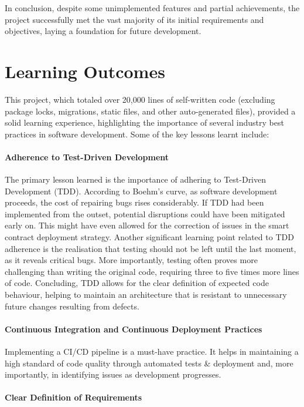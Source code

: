 In conclusion, despite some unimplemented features and partial achievements, the project successfully met the vast majority of its initial requirements and objectives, laying a foundation for future development.

\section{Learning Outcomes}

This project, which totaled over 20,000 lines of self-written code (excluding package locks, migrations, static files, and other auto-generated files), provided a solid learning experience, highlighting the importance of several industry best practices in software development. Some of the key lessons learnt include:

\paragraph{Adherence to Test-Driven Development}

The primary lesson learned is the importance of adhering to Test-Driven Development (TDD). According to Boehm's curve, as software development proceeds, the cost of repairing bugs rises considerably. If TDD had been implemented from the outset, potential disruptions could have been mitigated early on. This might have even allowed for the correction of issues in the smart contract deployment strategy. Another significant learning point related to TDD adherence is the realisation that testing should not be left until the last moment, as it reveals critical bugs. More importantly, testing often proves more challenging than writing the original code, requiring three to five times more lines of code. Concluding, TDD allows for the clear definition of expected code behaviour, helping to maintain an architecture that is resistant to unnecessary future changes resulting from defects.

\paragraph{Continuous Integration and Continuous Deployment Practices}

Implementing a CI/CD pipeline is a must-have practice. It helps in maintaining a high standard of code quality through automated tests \& deployment and, more importantly, in identifying issues as development progresses. 

\paragraph{Clear Definition of Requirements}

